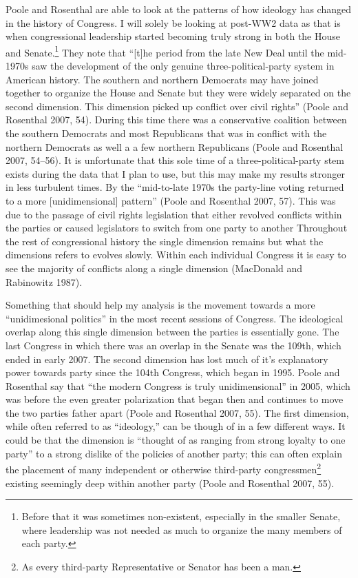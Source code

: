 \documentclass[12pt,twoside]{reedthesis}
\begin{document}
  Poole and Rosenthal are able to look at the patterns of how ideology has
  changed in the history of Congress. I will solely be looking at post-WW2
  data as that is when congressional leadership started becoming truly
  strong in both the House and Senate.\footnote{Before that it was
    sometimes non-existent, especially in the smaller Senate, where
    leadership was not needed as much to organize the many members of each
    party.} They note that ``{[}t{]}he period from the late New Deal until
  the mid-1970s saw the development of the only genuine
  three-political-party system in American history. The southern and
  northern Democrats may have joined together to organize the House and
  Senate but they were widely separated on the second dimension. This
  dimension picked up conflict over civil rights'' (Poole and Rosenthal
  2007, 54). During this time there was a conservative coalition between
  the southern Democrats and most Republicans that was in conflict with
  the northern Democrats as well a a few northern Republicans (Poole and
  Rosenthal 2007, 54--56). It is unfortunate that this sole time of a
  three-political-party stem exists during the data that I plan to use,
  but this may make my results stronger in less turbulent times. By the
  ``mid-to-late 1970s the party-line voting returned to a more
  {[}unidimensional{]} pattern'' (Poole and Rosenthal 2007, 57). This was
  due to the passage of civil rights legislation that either revolved
  conflicts within the parties or caused legislators to switch from one
  party to another Throughout the rest of congressional history the single
  dimension remains but what the dimensions refers to evolves slowly.
  Within each individual Congress it is easy to see the majority of
  conflicts along a single dimension (MacDonald and Rabinowitz 1987).
  
  Something that should help my analysis is the movement towards a more
  ``unidimesional politics'' in the most recent sessions of Congress. The
  ideological overlap along this single dimension between the parties is
  essentially gone. The last Congress in which there was an overlap in the
  Senate was the 109th, which ended in early 2007. The second dimension
  has lost much of it's explanatory power towards party since the 104th
  Congress, which began in 1995. Poole and Rosenthal say that ``the modern
  Congress is truly unidimensional'' in 2005, which was before the even
  greater polarization that began then and continues to move the two
  parties father apart (Poole and Rosenthal 2007, 55). The first
  dimension, while often referred to as ``ideology,'' can be though of in
  a few different ways. It could be that the dimension is ``thought of as
  ranging from strong loyalty to one party'' to a strong dislike of the
  policies of another party; this can often explain the placement of many
  independent or otherwise third-party congressmen\footnote{As every
    third-party Representative or Senator has been a man.} existing
  seemingly deep within another party (Poole and Rosenthal 2007, 55).
  
\end{document}
